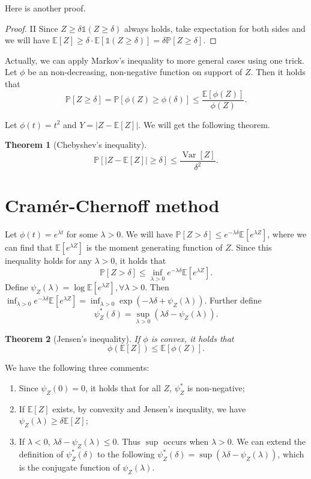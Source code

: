 \documentclass[10pt]{article}
\newcounter{lecnum}
\newtheorem{theorem}{Theorem}[lecnum]
\newcommand{\E}[1]{\mathbb{E}\!\left[#1\right]}
\renewcommand{\P}{\mathbb{P}}
\DeclareMathOperator*{\Variance}{Var}
\newcommand{\Var}[1]{\Variance\!\left[#1\right]}
\begin{document}
Here is another proof.

\begin{proof}{II}
Since $Z \geq \delta \mathds{1}(Z \geq \delta)$ always holds, take expectation for both sides and we will have $\E{Z} \geq \delta \cdot \E{ \mathds{1}(Z \geq \delta) } = \delta \P[ Z \geq \delta ]$.
\end{proof}

Actually, we can apply Markov's inequality to more general cases using one trick. Let $\phi$ be an non-decreasing, non-negative function on support of $Z$. Then it holds that 
$$
\P[ Z \geq \delta ] = \P[ \phi(Z) \geq \phi(\delta) ] \leq \frac{ \E{ \phi(Z) } }{\phi(Z)} .
$$

Let $\phi(t) = t^2$ and $Y = |Z - \E{Z} |$. We will get the following theorem.

\begin{theorem}[Chebyshev's inequality]
$$
\P[ | Z - \E{Z} | \geq \delta ] \leq \frac{ \Var{Z} }{ \delta^2 }.
$$
\end{theorem}

\section{Cram\'er-Chernoff method}

Let $\phi(t) = e^{\lambda t}$ for some $\lambda > 0$. We will have $\P[ Z  > \delta ] \leq e^{-\lambda \delta} \E{ e^{\lambda Z} }$, where we can find that $\E{ e^{\lambda Z} }$ is the moment generating function of $Z$. Since this inequality holds for any $\lambda > 0$, it holds that 
$$
\P[ Z > \delta ] \leq \inf_{\lambda > 0} e^{-\lambda \delta} \E{ e^{\lambda Z} }.
$$
Define $\psi_Z(\lambda) = \log \E{ e^{\lambda Z} }, \forall \lambda > 0$. Then $\inf_{\lambda > 0} e^{-\lambda \delta} \E{ e^{\lambda Z} } = \inf_{\lambda > 0} \exp( -\lambda \delta + \psi_Z(\lambda) )$. Further define 
$$
\psi_Z^*(\delta) = \sup_{\lambda > 0} ( \lambda \delta - \psi_Z(\lambda) ).
$$

\begin{theorem}[Jensen's inequality]
If $\phi$ is convex, it holds that 
$$
\phi( \E{Z} ) \leq \E{ \phi(Z) }.
$$
\end{theorem}

We have the following three comments:
\begin{enumerate}
\item Since $\psi_Z( 0 ) = 0$, it holds that for all $Z$, $\psi_Z^*$ is non-negative;
\item If $\E{Z}$ exists, by convexity and Jensen's inequality, we have $\psi_Z( \lambda ) \geq \delta \E{Z}$;
\item If $\lambda < 0$, $\lambda \delta - \psi_Z(\lambda) \leq 0$. Thus $\sup$ occurs when $\lambda > 0$. We can extend the definition of $\psi_Z^*(\delta)$ to the following $
\psi_Z^*(\delta) = \sup ( \lambda \delta - \psi_Z(\lambda) )$, which is the conjugate function of $\psi_Z(\lambda)$.
\end{enumerate}
\end{document}
